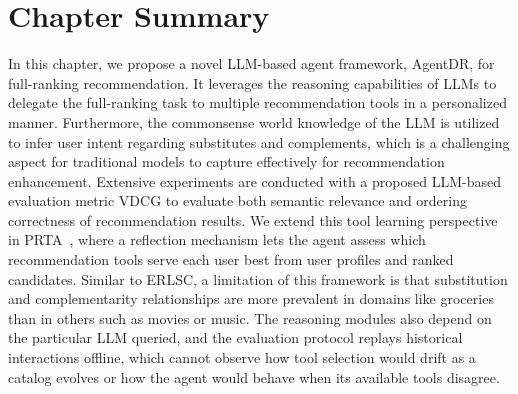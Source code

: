 \section{Chapter Summary}
In this chapter, we propose a novel LLM-based agent framework, AgentDR, for full-ranking recommendation. 
It leverages the reasoning capabilities of LLMs to delegate the full-ranking task to multiple recommendation tools in a personalized manner. Furthermore, the commonsense world knowledge of the LLM is utilized to infer user intent regarding substitutes and complements, which is a challenging aspect for traditional models to capture effectively for recommendation enhancement. 
Extensive experiments are conducted with a proposed LLM-based evaluation metric VDCG to evaluate both semantic relevance and ordering correctness of recommendation results.
We extend this tool learning perspective in PRTA~\cite{prta}, where a reflection mechanism lets the agent assess which recommendation tools serve each user best from user profiles and ranked candidates.
Similar to ERLSC, a limitation of this framework is that substitution and complementarity relationships are more prevalent in domains like groceries than in others such as movies or music.
The reasoning modules also depend on the particular LLM queried, and the evaluation protocol replays historical interactions offline, which cannot observe how tool selection would drift as a catalog evolves or how the agent would behave when its available tools disagree.

